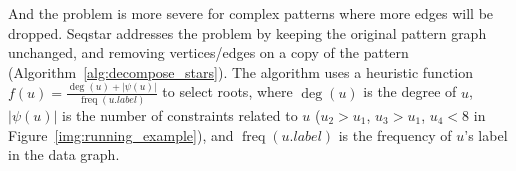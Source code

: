 \begin{enumerate}[noitemsep,leftmargin=0pt,align=left,labelwidth=\parindent]
  And the problem is more severe for complex patterns where more edges will be dropped.
  Seqstar addresses the problem by keeping the original pattern graph unchanged, and removing vertices/edges on a copy of the pattern (Algorithm~\ref{alg:decompose_stars}).
  The algorithm uses a heuristic function $f(u) = \frac{\deg(u) + |\psi(u)|}{\operatorname{freq}(u.label)}$ to select roots,
  where $\deg(u)$ is the degree of $u$, $|\psi(u)|$ is the number of constraints related to $u$ ($u_2 > u_1$, $u_3 > u_1$, $u_4 < 8$ in Figure~\ref{img:running_example}),
  and $\operatorname{freq}(u.label)$ is the frequency of $u$'s label in the data graph.
\end{enumerate}
